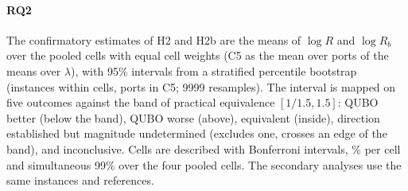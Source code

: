 \paragraph{RQ2} The confirmatory estimates of H2 and H2b are the means of $\log R$ and $\log R_b$ over the pooled cells
with equal cell weights (C5 as the mean over ports of the means over $\lambda$), with 95\% intervals from a stratified %
percentile bootstrap (instances within cells, ports in C5; 9999 resamples). The interval is mapped on five outcomes
against the band of practical equivalence $[1/1.5, 1.5]$: QUBO better (below the band), QUBO worse (above), equivalent %
(inside), direction established but magnitude undetermined (excludes one, crosses an edge of the band), and
inconclusive. Cells are described with Bonferroni intervals, \% per cell and simultaneous 99\% %
over the four pooled cells. The secondary analyses use the same instances and references.


